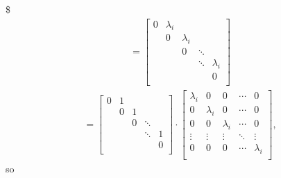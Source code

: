 \documentclass[letterpaper,10pt,english]{jupyterBook}
\begin{document}
\)\$
\begin{equation*}
\begin{split}
= \left[ {\begin{array}{ccccc}
    0 & \lambda_i &  &  & \\
     & 0 & \lambda_i &  &\\
     &  & 0 & \ddots &\\
     &  &  & \ddots & \lambda_i\\
     &  &  &  & 0\\
\end{array} } \right] 
\end{split}
\end{equation*}\begin{equation*}
\begin{split}
= \left[ {\begin{array}{ccccc}
    0 & 1 &  &  & \\
     & 0 & 1 &  &\\
     &  & 0 & \ddots &\\
     &  &  & \ddots & 1\\
     &  &  &  & 0\\
\end{array} } \right] \cdot \left[ {\begin{array}{ccccc}
    \lambda_i & 0 & 0 & \dotsm & 0\\
    0 & \lambda_i & 0 & \dotsm & 0\\
    0 & 0 & \lambda_i & \dotsm & 0\\
    \vdots & \vdots & \vdots & \ddots & \vdots\\
    0 & 0 & 0 & \dotsm & \lambda_i\\
\end{array} } \right],
\end{split}
\end{equation*}
\sphinxAtStartPar
so
\end{document}
